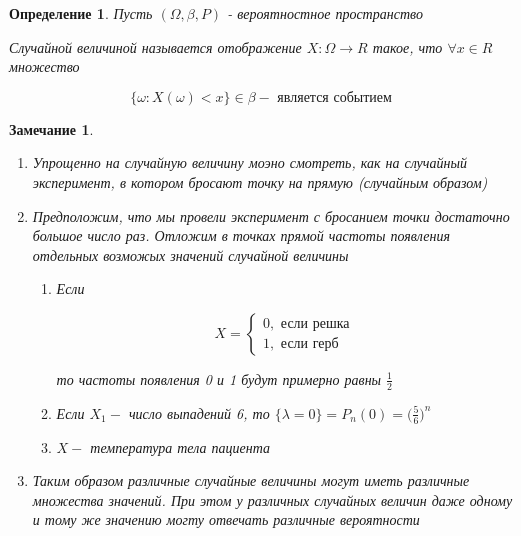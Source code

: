 \documentclass[a4paper, 14pt]{report}
\newtheorem{defenition}{Определение}[section]
\newtheorem{note}{Замечание}[section]
\begin{document}
\begin{defenition}
    Пусть $(\Omega, \beta, P)$ - вероятностное пространство

    Случайной величиной называется отображение $X: \Omega \to R$ такое, что $\forall x \in R$ множество

    $$
    \{ \omega : X(\omega) < x \} \in \beta - \text{ является событием}
    $$
\end{defenition}

\begin{note}
    \hfill

    \begin{enumerate}
        \item Упрощенно на случайную величину моэно смотреть, как на случайный эксперимент, в котором бросают точку на прямую (случайным образом)
        \item Предположим, что мы провели эксперимент с бросанием точки достаточно большое число раз. Отложим в точках прямой частоты появления отдельных возможых значений случайной величины

            \begin{enumerate}
                \item Если

                    $$
                    X =
                    \begin{cases}
                        0, \text{ если решка} \\
                        1, \text{ если герб}
                    \end{cases}
                    $$

                    то частоты появления 0 и 1 будут примерно равны $\frac{1}{2}$

                \item Если $X_1 -$ число выпадений 6, то $\{ \lambda = 0\} = P_n(0) = \big( \frac{5}{6} \big)^n$

                \item $X - $ температура тела пациента
            \end{enumerate}

        \item Таким образом различные случайные величины могут иметь различные множества значений. При этом у различных случайных величин даже одному и тому же значению могту отвечать различные вероятности
    \end{enumerate}
\end{note}
\end{document}
